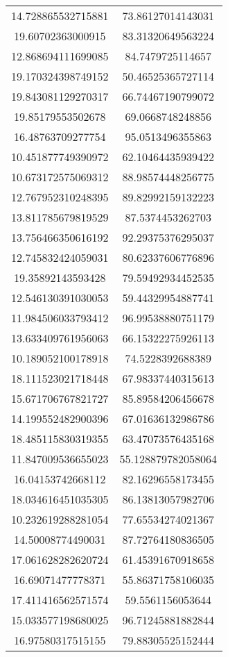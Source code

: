 \begin{table}
\begin{tabular}{cc}
14.728865532715881 & 73.86127014143031 \\
19.60702363000915 & 83.31320649563224 \\
12.868694111699085 & 84.7479725114657 \\
19.170324398749152 & 50.46525365727114 \\
19.843081129270317 & 66.74467190799072 \\
19.85179553502678 & 69.0668748248856 \\
16.48763709277754 & 95.0513496355863 \\
10.451877749390972 & 62.10464435939422 \\
10.673172575069312 & 88.98574448256775 \\
12.767952310248395 & 89.82992159132223 \\
13.811785679819529 & 87.5374453262703 \\
13.756466350616192 & 92.29375376295037 \\
12.745832424059031 & 80.62337606776896 \\
19.35892143593428 & 79.59492934452535 \\
12.546130391030053 & 59.44329954887741 \\
11.984506033793412 & 96.99538880751179 \\
13.633409761956063 & 66.15322275926113 \\
10.189052100178918 & 74.5228392688389 \\
18.111523021718448 & 67.98337440315613 \\
15.671706767821727 & 85.89584206456678 \\
14.199552482900396 & 67.01636132986786 \\
18.485115830319355 & 63.47073576435168 \\
11.847009536655023 & 55.128879782058064 \\
16.04153742668112 & 82.16296558173455 \\
18.034616451035305 & 86.13813057982706 \\
10.232619288281054 & 77.65534274021367 \\
14.50008774490031 & 87.72764180836505 \\
17.061628282620724 & 61.45391670918658 \\
16.69071477778371 & 55.86371758106035 \\
17.411416562571574 & 59.5561156053644 \\
15.033577198680025 & 96.71245881882844 \\
16.97580317515155 & 79.88305525152444 \\

\end{tabular}
\end{table}
